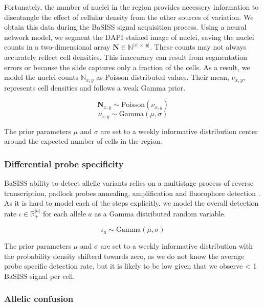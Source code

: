 Fortunately, the number of nuclei in the region provides necessery information to disentangle the effect of cellular density from the other sources of variation. We obtain this data during the \ac{BaSISS} signal acquisition process. Using a neural network model, we segment the DAPI stained image of nuclei, saving the nuclei counts in a two-dimensional array $\mathbf{N} \in \mathbb{N}^{|x| \times |y|}$. These counts may not always accurately reflect cell densities. This inaccuracy can result from segmentation errors or because the slide captures only a fraction of the cells. As a result, we model the nuclei counts $\mathbb{N}_{x,y}$ as Poisson distributed values. Their mean, $\nu_{x,y}$, represents cell densities and follows a weak Gamma prior.

\begin{equation}
    \mathbf{N}_{x,y} \sim \text{Poisson}({\nu}_{x,y})
\end{equation}
\begin{equation}
    {\nu}_{x,y} \sim \text{Gamma}(\mu, \sigma)
\end{equation}

The prior parameters $\mu$ and $\sigma$ are set to a weekly informative distribution center around the expected number of cells in the region.

\subsubsection*{Differential probe specificity}

\ac{BaSISS} ability to detect allelic variants relies on a multistage process of reverse transcription, padlock probes annealing, amplification and fluorophore detection \parencite{Svedlund2019-xb}. As it is hard to model each of the steps explicitly, we model the overall detection rate $\iota \in \mathbb{R}^{|a|}_{+}$ for each allele $a$ as a Gamma distributed random variable.

\begin{equation}
    {\iota}_{a} \sim \text{Gamma}(\mu, \sigma)
\end{equation}

The prior parameters $\mu$ and $\sigma$ are set to a weekly informative distribution with the probability density shifterd towards zero, as we do not know the average probe specific detection rate, but it is likely to be low given that we observe < 1 \ac{BaSISS} signal per cell.

\subsubsection*{Allelic confusion}

